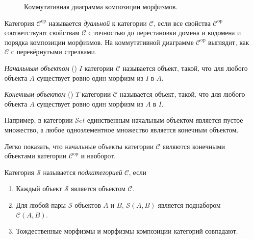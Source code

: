\begin{figure}[h]
    \centering
    \caption{Коммутативная диаграмма композиции морфизмов.}
    \label{cd:compose}
\end{figure}

\begin{definition}
  Категория $\mathcal{C}^{\mathrm{op}}$ называется \emph{дуальной} к категории $\mathcal{C}$, если все свойства $\mathcal{C}^{\mathrm{op}}$ соответствуют свойствам $\mathcal{C}$ с точностью до перестановки домена и кодомена и порядка композиции морфизмов. На коммутативной диаграмме $\mathcal{C}^{\mathrm{op}}$ выглядит, как $\mathcal{C}$ с перевёрнутыми стрелками.
\end{definition}

\begin{definition}
  \emph{Начальным объектом} () $I$ категории $\mathcal{C}$ называется объект, такой, что для любого объекта $A$ существует ровно один морфизм из $I$ в $A$.
\end{definition}

\begin{definition}
  \emph{Конечным объектом} () $T$ категории $\mathcal{C}$ называется объект, такой, что для любого объекта $A$ существует ровно один морфизм из $A$ в $I$.
\end{definition}

Например, в категории $\mathcal{S}et$ единственным начальным объектом является пустое множество, а любое одноэлементное множество является конечным объектом.

Легко показать, что начальные объекты категории $\mathcal{C}$ являются конечными объектами категории $\mathcal{C}^\mathrm{op}$ и наоборот.

\begin{definition}
  Категория $\mathcal{S}$ называется \emph{подкатегорией} $\mathcal{C}$, если
  \begin{enumerate}
    \item Каждый объект $\mathcal{S}$ является объектом $\mathcal{C}$.
    \item Для любой пары $\mathcal{S}$-объектов $A$ и $B$, $\mathcal{S}(A, B)$ является поднабором $\mathcal{C}(A, B)$.
    \item Тождественные морфизмы и морфизмы композиции категорий совпадают.
  \end{enumerate}
\end{definition}

